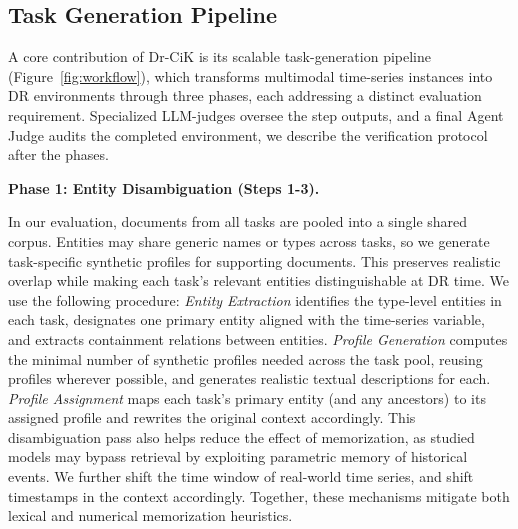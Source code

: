 \documentclass[]{servicenow}
\DeclareRobustCommand{\stagecircle}[1]{%
  \tikz[baseline=-0.55ex]{
    \node[
      circle,
      fill=stagegreen,
      text=white,
      font=\bfseries\scriptsize,
      inner sep=0pt,
      minimum size=1.em
    ] {#1};
  }%
}
\newcommand{\paragraphtight}[1]{%
  \par\vspace{-0.75\parskip}\vspace{0.3em}%
  \noindent\textbf{#1}\hspace{0.4em}\ignorespaces
}
\begin{document}
\subsection{Task Generation Pipeline}
A core contribution of Dr-CiK is its scalable task-generation pipeline (Figure~\ref{fig:workflow}), which transforms multimodal time-series instances into DR environments through three phases, each addressing a distinct evaluation requirement. 
Specialized LLM-judges oversee the step outputs, and a final Agent Judge audits the completed environment, we describe the verification protocol after the phases.




\paragraphtight{Phase 1: Entity Disambiguation (Steps 1-3).}
In our evaluation, documents from all tasks are pooled into a single shared corpus.
Entities may share generic names or types across tasks, so we generate task-specific synthetic profiles for supporting documents. This preserves realistic overlap while making each task's relevant entities distinguishable at DR time. We use the following procedure:
\stagecircle{1} \emph{Entity Extraction} identifies the type-level entities in each task, designates one primary entity aligned with the time-series variable, and extracts containment relations between entities. 
\stagecircle{2} \emph{Profile Generation} computes the minimal number of synthetic profiles needed across the task pool, reusing profiles wherever possible, and generates realistic textual descriptions for each. 
\stagecircle{3} \emph{Profile Assignment} maps each task's primary entity (and any ancestors) to its assigned profile and rewrites the original context accordingly. 
This disambiguation pass also helps reduce the effect of memorization, as studied models may bypass retrieval by exploiting parametric memory of historical events.
We further shift the time window of real-world time series, and shift timestamps in the context accordingly. Together, these mechanisms mitigate both lexical and numerical memorization heuristics.
\end{document}
